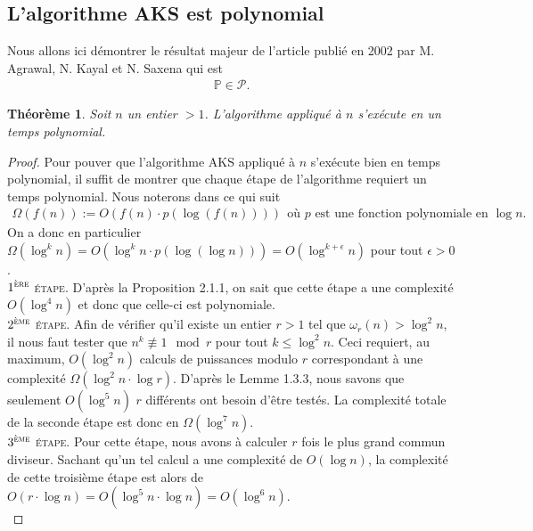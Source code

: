 \documentclass[11pt]{article}
\newtheorem{theo}{Théorème}[subsection]
\begin{document}
\subsection{L'algorithme AKS est polynomial}

Nous allons ici démontrer le résultat majeur de l'article publié en 2002 par M. Agrawal, N. Kayal et N. Saxena qui est
\begin{align*}
\mathbb{P} \in \mathcal{P}.
\end{align*}

\begin{theo}
Soit $n$ un entier $>1$. L'algorithme appliqué à $n$ s’exécute en un temps polynomial.
\end{theo}

\begin{small}
\begin{proof}
Pour pouver que l'algorithme AKS appliqué à $n$ s'exécute bien en temps polynomial, il suffit de montrer que chaque étape de l'algorithme requiert un temps polynomial. Nous noterons dans ce qui suit
\begin{align*}
\Omega(f(n)):=O(f(n) \cdot p(\log(f(n))))\ \  \text{où $p$ est une fonction polynomiale en $\log n$.}
\end{align*}
On a donc en particulier $\Omega(\log^k n)=O(\log^k n \cdot p(\log(\log n)))=O(\log^{k+\epsilon} n)$ pour tout $\epsilon>0$.\\

\noindent
$1^\textsc{ère}$ \textsc{étape.} D'après la Proposition 2.1.1, on sait que cette étape a une complexité $O(\log^4 n)$ et donc que celle-ci est polynomiale.\\

\noindent
$2^\textsc{ème}$ \textsc{étape}. Afin de vérifier qu'il existe un entier $r>1$ tel que $\omega_r(n) > \log^2 n$, il nous faut tester que $n^k \not \equiv 1 \mod r$ pour tout $k \leqslant \log^2 n$. Ceci requiert, au maximum, $O(\log^2 n)$ calculs de puissances modulo $r$ correspondant à une complexité $\Omega(\log^2 n \cdot \log r)$. D'après le Lemme 1.3.3, nous savons que seulement $O(\log^5 n)$ $r$ différents ont besoin d'être testés. La complexité totale de la seconde étape est donc en $\Omega(\log^7 n)$.\\

\noindent
$3^\textsc{ème}$ \textsc{étape}. Pour cette étape, nous avons à calculer $r$ fois le plus grand commun diviseur. Sachant qu'un tel calcul a une complexité de $O(\log n)$, la complexité de cette troisième étape est alors de $O(r \cdot \log n)=O(\log^5 n \cdot \log n)=O(\log^6 n)$.\\


\end{proof}
\end{small}
\end{document}
